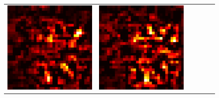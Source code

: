 \documentclass[preprint,12pt]{elsarticle}
\begin{document}
\begin{figure}[ht]
\begin{tabular}{cccccc}
  \includegraphics[scale=\scale]{../visualizations/examples/cifar10/cnn/positive_saliency_map/1.png} & 
  \includegraphics[scale=\scale]{../visualizations/examples/cifar10/cnn/negative_saliency_map/1.png} & 

\end{tabular}
\end{figure}
\end{document}
